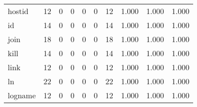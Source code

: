 \begin{longtable}{lp{1.3cm}p{1.3cm}p{1.3cm}p{1.3cm}p{1.3cm}p{1.3cm}p{1.3cm}p{1.3cm}p{1.3cm}}
hostid    &                     12 &                                             0 &                                            0 &                                           0 &                                            0 &                                         12 &                                1.000 &                                  1.000 &                                1.000 \\
id        &                     14 &                                             0 &                                            0 &                                           0 &                                            0 &                                         14 &                                1.000 &                                  1.000 &                                1.000 \\
join      &                     18 &                                             0 &                                            0 &                                           0 &                                            0 &                                         18 &                                1.000 &                                  1.000 &                                1.000 \\
kill      &                     14 &                                             0 &                                            0 &                                           0 &                                            0 &                                         14 &                                1.000 &                                  1.000 &                                1.000 \\
link      &                     12 &                                             0 &                                            0 &                                           0 &                                            0 &                                         12 &                                1.000 &                                  1.000 &                                1.000 \\
ln        &                     22 &                                             0 &                                            0 &                                           0 &                                            0 &                                         22 &                                1.000 &                                  1.000 &                                1.000 \\
logname   &                     12 &                                             0 &                                            0 &                                           0 &                                            0 &                                         12 &                                1.000 &                                  1.000 &                                1.000 \\

\end{longtable}
